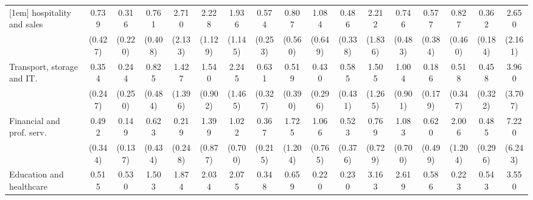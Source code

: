 {\begin{tabular}{l*{16}{c}}
[1em]
hospitality and sales&       0.739         &       0.316         &       0.761         &       2.710         &       2.228         &       1.936         &       0.574         &       0.807         &       1.084         &       0.486         &       2.212         &       0.746         &       0.577         &       0.827         &       0.362\sym{*}  &       2.650         \\
                    &     (0.427)         &     (0.220)         &     (0.408)         &     (2.133)         &     (1.129)         &     (1.145)         &     (0.253)         &     (0.560)         &     (0.649)         &     (0.338)         &     (1.836)         &     (0.483)         &     (0.384)         &     (0.460)         &     (0.184)         &     (2.161)         \\
[1em]
Transport, storage and IT.&       0.354         &       0.244         &       0.825         &       1.427         &       1.540         &       2.245         &       0.631         &       0.519         &       0.430         &       0.585         &       1.505         &       1.004         &       0.186         &       0.518         &       0.458         &       3.960         \\
                    &     (0.247)         &     (0.250)         &     (0.484)         &     (1.396)         &     (0.902)         &     (1.465)         &     (0.327)         &     (0.390)         &     (0.296)         &     (0.431)         &     (1.265)         &     (0.901)         &     (0.179)         &     (0.347)         &     (0.322)         &     (3.707)         \\
[1em]
Financial and prof. serv.&       0.492         &       0.149\sym{*}  &       0.623         &       0.219         &       1.399         &       1.022         &       0.367         &       1.725         &       1.066         &       0.523         &       0.769         &       1.083         &       0.620         &       2.006         &       0.485         &       7.220\sym{*}  \\
                    &     (0.344)         &     (0.137)         &     (0.434)         &     (0.248)         &     (0.877)         &     (0.700)         &     (0.215)         &     (1.204)         &     (0.765)         &     (0.376)         &     (0.729)         &     (0.700)         &     (0.499)         &     (1.204)         &     (0.296)         &     (6.243)         \\
[1em]
Education and healthcare&       0.515         &       0.530         &       1.503         &       1.874         &       2.034         &       2.075         &       0.348         &       0.659         &       0.220         &       0.230         &       3.163         &       2.619         &       0.586         &       0.223         &       0.543         &       3.550         \\

\end{tabular}}
